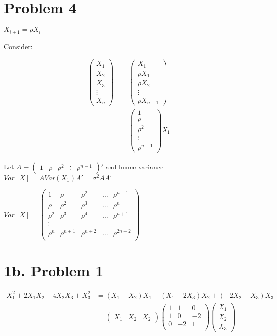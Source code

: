 \documentclass[a4paper]{article}
\begin{document}
\section{Problem 4}

$X_{i+1} = \rho X_i$

Consider:

\begin{align*}
\begin{pmatrix}
X_1\\
X_2\\
X_3\\
\vdots\\
X_n
\end{pmatrix} &= \begin{pmatrix}
X_1\\
\rho X_1\\
\rho X_2\\
\vdots\\
\rho X_{n-1}
\end{pmatrix}\\
&= \begin{pmatrix}
1\\
\rho\\
\rho^2\\
\vdots\\
\rho^{n-1}
\end{pmatrix}X_1
\end{align*}

Let $A=\begin{pmatrix}1 & \rho & \rho^2 & \vdots & \rho^{n-1}\end{pmatrix}'$
and hence variance $Var[X] = AVar(X_1)A' = \sigma^2AA'$

$Var[X] = \begin{pmatrix}
1 & \rho & \rho^2 & \dots & \rho^{n-1}\\
\rho & \rho^2 & \rho^3 & \dots & \rho^n\\
\rho^2 & \rho^3 & \rho^4 & \dots & \rho^{n+1}\\
\vdots\\
\rho^n & \rho^{n+1} & \rho^{n+2} & \dots & \rho^{2n-2}\\
\end{pmatrix}$

\section*{1b. Problem 1}

\begin{align*}
X_1^2+2X_1X_2-4X_2X_3+X_3^2 &= (X_1+X_2)X_1 + (X_1-2X_3)X_2 + (-2X_2+X_3)X_3\\
&= \begin{pmatrix}
X_1 & X_2 & X_2
\end{pmatrix}\begin{pmatrix}
1 & 1 & 0\\
1 & 0 & -2\\
0 & -2 & 1\\
\end{pmatrix}\begin{pmatrix}
X_1\\
X_2\\
X_3
\end{pmatrix}
\end{align*}
\end{document}
